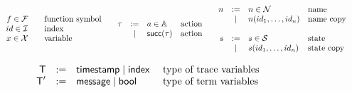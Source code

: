 \documentclass[a4paper]{article}
\theoremstyle{remark}
\begin{document}
\begin{figure}
\[
\begin{array}[t]{ccc}
    \begin{array}{rcl}
    f \in \mathcal{F} & & \text{function symbol}\\
    id \in \mathcal{I}  & & \text{index}\\

    x \in \mathcal{X} & & \text{variable}\\
    \end{array}
&     \begin{array}{rcll}
\tau &:=& a \in \mathbb{A} & \text{action} \\
& \mid & \textsf{succ}(\tau) & \text{action} \\
\end{array}
   &
    \begin{array}{rcll}

    n &:=& n \in \mathcal{N} & \text{name}\\
    &\mid& n(id_1,\dots,id_n) & \text{name copy} \\
    \\

    s&:=& s \in \mathcal{S} & \text{state}\\
    &\mid& s(id_1,\dots,id_n) & \text{state copy}\\

    \end{array}
\end{array}
\]

\[
  \begin{array}{c}
     \begin{array}{rcll}
    \textsf{T} &  := & \textsf{timestamp} \mid \textsf{index} & \text{
        type of trace variables} \\
    \textsf{T}' &  := & \textsf{message} \mid \textsf{bool} & \text{
        type of term variables} \\

      \\


\end{array}
\end{array}\]
\end{figure}
\end{document}
